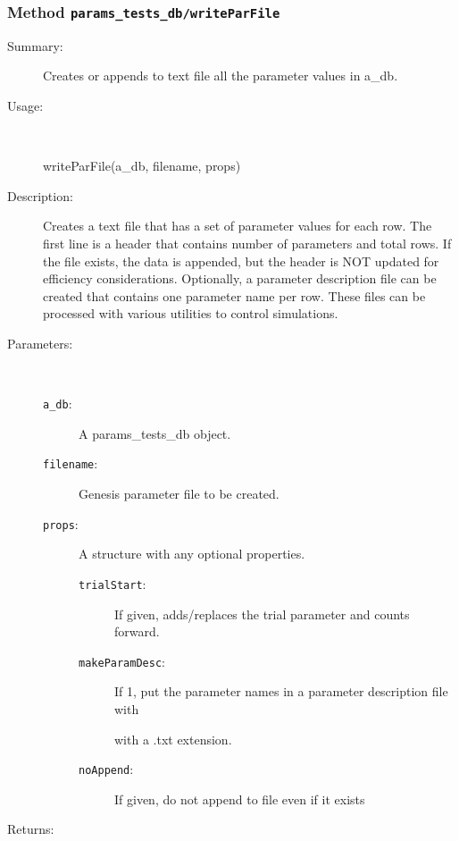 \subsubsection[Method \texttt{writeParFile}]{Method \texttt{params\_tests\_db/writeParFile}}%
%
\label{ref_params_tests_db__writeParFile}%
\hypertarget{ref_params_tests_db__writeParFile}{}%
\begin{description}
\item[Summary:]Creates or appends to text file all the parameter values in a\_db.
%
\item[Usage:]~%
\begin{lyxcode}%
writeParFile(a\_db, filename, props)
%
\end{lyxcode}%
%
\item[Description:]%
Creates a text file that has a set of parameter values for each row. The
 first line is a header that contains number of parameters and total
 rows. If the file exists, the data is appended, but the header is NOT
 updated for efficiency considerations. Optionally, a parameter description
 file can be created that contains one parameter name per row. These files
 can be processed with various utilities to control simulations.
\item[Parameters:]~
\begin{description}%
\item[\texttt{a\_db}:]
 A params\_tests\_db object.
\item[\texttt{filename}:]
 Genesis parameter file to be created.
\item[\texttt{props}:]
 A structure with any optional properties.
\begin{description}%
\item[\texttt{trialStart}:]
 If given, adds/replaces the trial parameter and counts forward.
\item[\texttt{makeParamDesc}:]
 If 1, put the parameter names in a parameter description file with

with a .txt extension.
\item[\texttt{noAppend}:]
 If given, do not append to file even if it exists
\end{description}%
\end{description}%
%
\item[Returns:
]~


\end{description}

